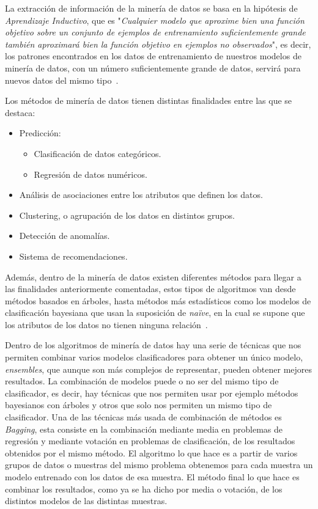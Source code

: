 La extracción de información de la minería de datos se basa en la hipótesis de \textit{Aprendizaje Inductivo}, que es "\textit{Cualquier modelo que aproxime bien una función objetivo sobre un conjunto de ejemplos de entrenamiento suficientemente grande también aproximará bien la función objetivo en ejemplos no observados}", es decir, los patrones encontrados en los datos de entrenamiento de nuestros modelos de minería de datos, con un número suficientemente grande de datos, servirá para nuevos datos del mismo tipo~\cite{mdintro}.

Los métodos de minería de datos tienen distintas finalidades entre las que se destaca:
\begin{itemize}
	\item Predicción:
	\begin{itemize}
		\item Clasificación de datos categóricos.
		\item Regresión de datos numéricos.
	\end{itemize}
	\item Análisis de asociaciones entre los atributos que definen los datos.
	\item Clustering, o agrupación de los datos en distintos grupos.
	\item Detección de anomalías.
	\item Sistema de recomendaciones.
\end{itemize}

Además, dentro de la minería de datos existen diferentes métodos para llegar a las finalidades anteriormente comentadas, estos tipos de algoritmos van desde métodos basados en árboles, hasta métodos más estadísticos como los modelos de clasificación bayesiana que usan la suposición de \textit{naïve}, en la cual se supone que los atributos de los datos no tienen ninguna relación~\cite{mdrf}.

Dentro de los algoritmos de minería de datos hay una serie de técnicas que nos permiten combinar varios modelos clasificadores para obtener un único modelo, \textit{ensembles}, que aunque son más complejos de representar, pueden obtener mejores resultados. La combinación de modelos puede o no ser del mismo tipo de clasificador, es decir, hay técnicas que nos permiten usar por ejemplo métodos bayesianos con árboles y otros que solo nos permiten un mismo tipo de clasificador. Una de las técnicas más usada de combinación de métodos es \textit{Bagging}, esta consiste en la combinación mediante media en problemas de regresión y mediante votación en problemas de clasificación, de los resultados obtenidos por el mismo método. El algoritmo lo que hace es a partir de varios grupos de datos o muestras del mismo problema obtenemos para cada muestra un modelo entrenado con los datos de esa muestra. El método final lo que hace es combinar los resultados, como ya se ha dicho por media o votación, de los distintos modelos de las distintas muestras.

